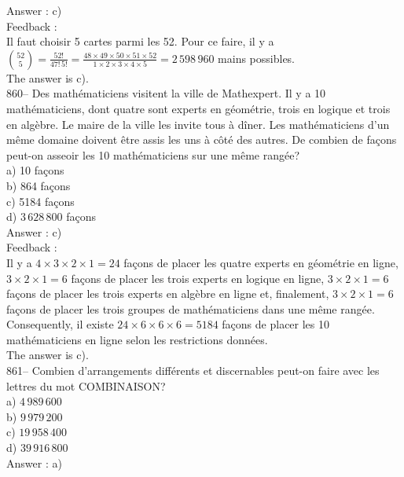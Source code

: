 \documentclass[letterpaper, 12pt]{article}
\begin{document}
Answer : c)\\

Feedback : \\
Il faut choisir 5 cartes parmi les 52.  Pour ce faire, il y a
$\binom{52}{5}=\frac{52!}{47!\,5!}=\frac{48\times49\times50\times51\times52}{1\times2\times3\times4\times5}=2\,598\,960$
mains possibles.\\
The answer is c).\\

860--  Des math\'ematiciens visitent la ville de Mathexpert.  Il y a 10
math\'ematiciens, dont quatre sont experts en g\'eom\'etrie, trois en
logique et trois en alg\`ebre.  Le maire de la ville les invite tous \`a
d\^iner.  Les math\'ematiciens d'un m\^eme domaine doivent \^etre assis les
uns \`a c\^ot\'e des autres.  De combien de fa\c cons peut-on asseoir les 10
math\'ematiciens sur une m\^eme rang\'ee?\\
a) 10  fa\c cons\\
b) 864  fa\c cons\\
c) 5184  fa\c cons\\
d) $3\,628\,800$  fa\c cons\\

Answer : c)\\

Feedback : \\
Il y a $4\times3\times2\times1=24$ fa\c cons de placer les quatre
experts en g\'eom\'etrie en ligne, $3\times2\times1=6$ fa\c cons de
placer les trois experts en logique en ligne, $3\times2\times1=6$
fa\c cons
de placer les trois experts en alg\`ebre en ligne et, finalement,
$3\times2\times1=6$ fa\c cons de placer les trois groupes de
math\'ematiciens dans une m\^eme rang\'ee.  \\
Consequently, il existe $24\times6\times6\times6=5184$ fa\c cons de
placer les 10 math\'ematiciens en ligne selon les restrictions donn\'ees.
\\
The answer is c).\\

861-- Combien d'arrangements diff\'erents et discernables peut-on faire avec
les lettres du mot \sloppy \mbox{COMBINAISON?}\\
a) $4\,989\,600$\\
b) $9\,979\,200$\\
c) $19\,958\,400$\\
d) $39\,916\,800$\\

Answer : a)\\
\end{document}
